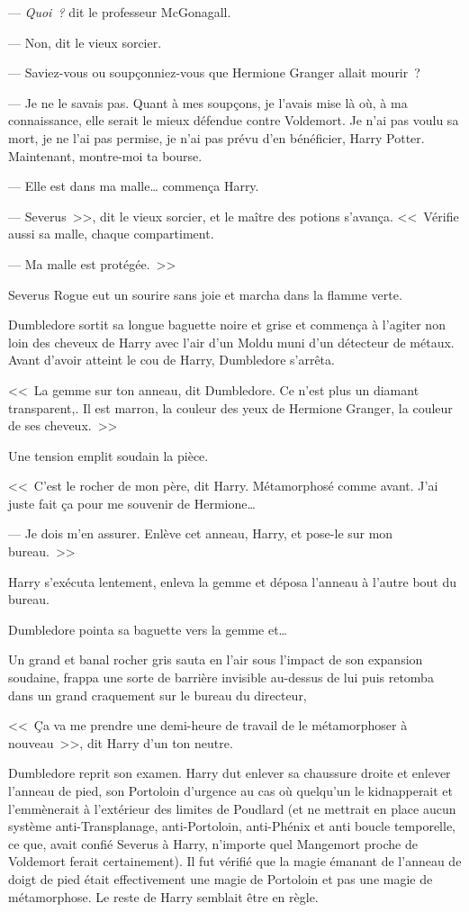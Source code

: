 --- \emph{Quoi~?} dit le professeur McGonagall.

--- Non, dit le vieux sorcier.

--- Saviez-vous ou soupçonniez-vous que Hermione Granger allait mourir~?

--- Je ne le savais pas. Quant à mes soupçons, je l'avais mise là où, à ma connaissance, elle serait le mieux défendue contre Voldemort. Je n'ai pas voulu sa mort, je ne l'ai pas permise, je n'ai pas prévu d'en bénéficier, Harry Potter. Maintenant, montre-moi ta bourse.

--- Elle est dans ma malle… commença Harry.

--- Severus~>>, dit le vieux sorcier, et le maître des potions s'avança. <<~Vérifie aussi sa malle, chaque compartiment.

--- Ma malle est protégée.~>>

Severus Rogue eut un sourire sans joie et marcha dans la flamme verte.

Dumbledore sortit sa longue baguette noire et grise et commença à l'agiter non loin des cheveux de Harry avec l'air d'un Moldu muni d'un détecteur de métaux. Avant d'avoir atteint le cou de Harry, Dumbledore s'arrêta.

<<~La gemme sur ton anneau, dit Dumbledore. Ce n'est plus un diamant transparent,. Il est marron, la couleur des yeux de Hermione Granger, la couleur de ses cheveux.~>>

Une tension emplit soudain la pièce.

<<~C'est le rocher de mon père, dit Harry. Métamorphosé comme avant. J'ai juste fait ça pour me souvenir de Hermione…

--- Je dois m'en assurer. Enlève cet anneau, Harry, et pose-le sur mon bureau.~>>

Harry s'exécuta lentement, enleva la gemme et déposa l'anneau à l'autre bout du bureau.

Dumbledore pointa sa baguette vers la gemme et…

Un grand et banal rocher gris sauta en l'air sous l'impact de son expansion soudaine, frappa une sorte de barrière invisible au-dessus de lui puis retomba dans un grand craquement sur le bureau du directeur,

<<~Ça va me prendre une demi-heure de travail de le métamorphoser à nouveau~>>, dit Harry d'un ton neutre.

Dumbledore reprit son examen. Harry dut enlever sa chaussure droite et enlever l'anneau de pied, son Portoloin d'urgence au cas où quelqu'un le kidnapperait et l'emmènerait à l'extérieur des limites de Poudlard (et ne mettrait en place aucun système anti-Transplanage, anti-Portoloin, anti-Phénix et anti boucle temporelle, ce que, avait confié Severus à Harry, n'importe quel Mangemort proche de Voldemort ferait certainement). Il fut vérifié que la magie émanant de l'anneau de doigt de pied était effectivement une magie de Portoloin et pas une magie de métamorphose. Le reste de Harry semblait être en règle.


